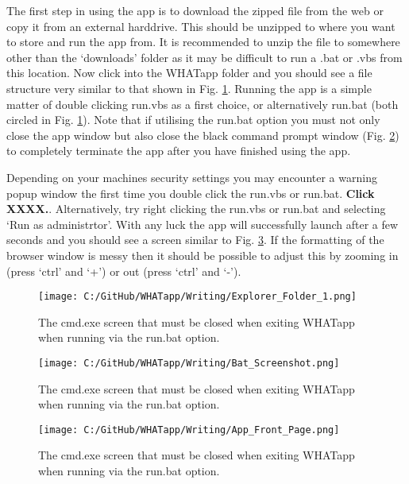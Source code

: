 \documentclass[11pt]{article}
\begin{document}
The first step in using the app is to download the zipped file from the web or copy it from an external harddrive. This should be unzipped to where you want to store and run the app from. It is recommended to unzip the file to somewhere other than the `downloads' folder as it may be difficult to run a .bat or .vbs from this location. Now click into the WHATapp folder and you should see a file structure very similar to that shown in Fig. \ref{fig:expl1screen}. Running the app is a simple matter of double clicking run.vbs as a first choice, or alternatively run.bat (both circled in Fig. \ref{fig:expl1screen}). Note that if utilising the run.bat option you must not only close the app window but also close the black command prompt window (Fig. \ref{fig:batscreen}) to completely terminate the app after you have finished using the app.

Depending on your machines security settings you may encounter a warning popup window the first time you double click the run.vbs or run.bat. {\bf Click XXXX.}. Alternatively, try right clicking the run.vbs or run.bat and selecting `Run as administrtor'. With any luck the app will successfully launch after a few seconds and you should see a screen similar to Fig. \ref{fig:frontpg}. If the formatting of the browser window is messy then it should be possible to adjust this by zooming in (press `ctrl' and `+') or out (press `ctrl' and `-').

 \begin{figure} [h]
  \centering
\texttt{[image: C:/GitHub/WHATapp/Writing/Explorer\_Folder\_1.png]}
  \caption {The cmd.exe screen that must be closed when exiting WHATapp when running via the run.bat option.}
  \label{fig:expl1screen}
\end{figure}



 \begin{figure} [h]
  \centering
\texttt{[image: C:/GitHub/WHATapp/Writing/Bat\_Screenshot.png]}
  \caption {The cmd.exe screen that must be closed when exiting WHATapp when running via the run.bat option.}
  \label{fig:batscreen}
\end{figure}


 \begin{figure} [h]
  \centering
\texttt{[image: C:/GitHub/WHATapp/Writing/App\_Front\_Page.png]}
  \caption {The cmd.exe screen that must be closed when exiting WHATapp when running via the run.bat option.}
  \label{fig:frontpg}
\end{figure}
\end{document}
